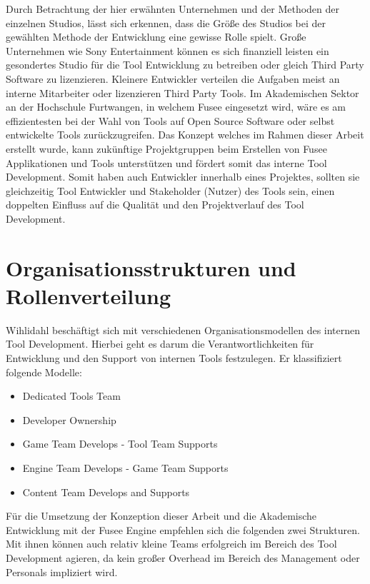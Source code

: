 \documentclass[pagesize, paper=a4, fontsize=12pt, titlepage=true, headings=small, headnosepline, abstractoff, liststotoc, nochapterprefix, plainheadsepline, twoside]{scrreprt}
\begin{document}
Durch Betrachtung der hier erwähnten Unternehmen und der Methoden der einzelnen Studios, lässt sich erkennen, dass die Größe des Studios bei der gewählten Methode der Entwicklung eine gewisse Rolle spielt. Große Unternehmen wie Sony Entertainment können es sich finanziell leisten ein gesondertes Studio für die Tool Entwicklung zu betreiben oder gleich Third Party Software zu lizenzieren. Kleinere Entwickler verteilen die Aufgaben meist an interne Mitarbeiter oder lizenzieren Third Party Tools. Im Akademischen Sektor an der Hochschule Furtwangen, in welchem Fusee eingesetzt wird, wäre es am effizientesten bei der Wahl von Tools auf Open Source Software oder selbst entwickelte Tools zurückzugreifen. Das Konzept welches im Rahmen dieser Arbeit erstellt wurde, kann zukünftige Projektgruppen beim Erstellen von Fusee Applikationen und Tools unterstützen und fördert somit das interne Tool Development. Somit haben auch Entwickler innerhalb eines Projektes, sollten sie gleichzeitig Tool Entwickler und Stakeholder (Nutzer) des Tools sein, einen doppelten Einfluss auf die Qualität und den Projektverlauf des Tool Development.

\section{Organisationsstrukturen und Rollenverteilung}
Wihlidahl \autocite[S. 5]{Wihlidal2006} beschäftigt sich mit verschiedenen Organisationsmodellen des internen Tool Development. Hierbei geht es darum die Verantwortlichkeiten für Entwicklung und den Support von internen Tools festzulegen. Er klassifiziert folgende Modelle:
\begin{itemize}
\item Dedicated Tools Team
\item Developer Ownership
\item Game Team Develops - Tool Team Supports
\item Engine Team Develops - Game Team Supports
\item Content Team Develops and Supports
\end{itemize}

Für die Umsetzung der Konzeption dieser Arbeit und die Akademische Entwicklung mit der Fusee Engine empfehlen sich die folgenden zwei Strukturen. Mit ihnen können auch relativ kleine Teams erfolgreich im Bereich des Tool Development agieren, da kein großer Overhead im Bereich des Management oder Personals impliziert wird.
\end{document}

